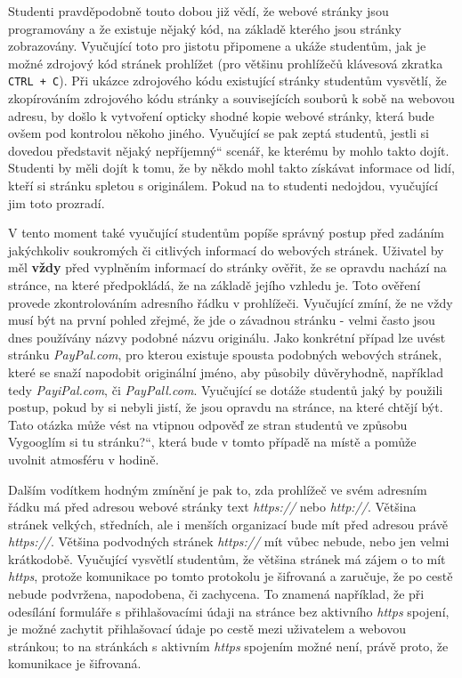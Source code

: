 \documentclass[a4paper, 12pt]{article}
\providecommand{\uv}[1]{\quotedblbase #1\textquotedblleft}
\begin{document}
Studenti pravděpodobně touto dobou již vědí, že webové stránky jsou programovány a že existuje nějaký kód, na základě kterého jsou stránky zobrazovány. Vyučující toto pro jistotu připomene a ukáže studentům, jak je možné zdrojový kód stránek prohlížet (pro většinu prohlížečů klávesová zkratka \texttt{CTRL + C}). Při ukázce zdrojového kódu existující stránky studentům vysvětlí, že zkopírováním zdrojového kódu stránky a souvisejících souborů k sobě na webovou adresu, by došlo k vytvoření opticky shodné kopie webové stránky, která bude ovšem pod kontrolou někoho jiného. Vyučující se pak zeptá studentů, jestli si dovedou představit nějaký \uv{nepříjemný} scenář, ke kterému by mohlo takto dojít. Studenti by měli dojít k tomu, že by někdo mohl takto získávat informace od lidí, kteří si stránku spletou s originálem. Pokud na to studenti nedojdou, vyučující jim toto prozradí.

V tento moment také vyučující studentům popíše správný postup před zadáním jakýchkoliv soukromých či citlivých informací do webových stránek. Uživatel by měl \textbf{vždy} před vyplněním informací do stránky ověřit, že se opravdu nachází na stránce, na které předpokládá, že na základě jejího vzhledu je. Toto ověření provede zkontrolováním adresního řádku v prohlížeči. Vyučující zmíní, že ne vždy musí být na první pohled zřejmé, že jde o závadnou stránku - velmi často jsou dnes používány názvy podobné názvu originálu. Jako konkrétní případ lze uvést stránku \textit{PayPal.com}, pro kterou existuje spousta podobných webových stránek, které se snaží napodobit originální jméno, aby působily důvěryhodně, například tedy \textit{PayiPal.com}, či \textit{PayPall.com}. Vyučující se dotáže studentů jaký by použili postup, pokud by si nebyli jistí, že jsou opravdu na stránce, na které chtějí být. Tato otázka může vést na vtipnou odpověď ze stran studentů ve způsobu \uv{Vygooglím si tu stránku?}, která bude v tomto případě na místě a pomůže uvolnit atmosféru v hodině.

Dalším vodítkem hodným zmínění je pak to, zda prohlížeč ve svém adresním řádku má před adresou webové stránky text \textit{https://} nebo \textit{http://}. Většina stránek velkých, středních, ale i menších organizací bude mít před adresou právě \textit{https://}. Většina podvodných stránek \textit{https://} mít vůbec nebude, nebo jen velmi krátkodobě. Vyučující vysvětlí studentům, že většina stránek má zájem o to mít \textit{https}, protože komunikace po tomto protokolu je šifrovaná a zaručuje, že po cestě nebude podvržena, napodobena, či zachycena. To znamená například, že při odesílání formuláře s přihlašovacími údaji na stránce bez aktivního \textit{https} spojení, je možné zachytit přihlašovací údaje po cestě mezi uživatelem a webovou stránkou; to na stránkách s aktivním \textit{https} spojením možné není, právě proto, že komunikace je šifrovaná.
\end{document}
